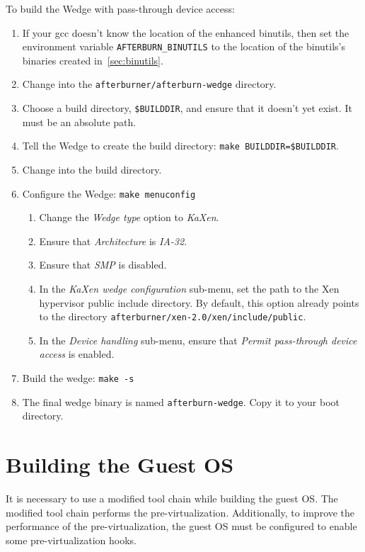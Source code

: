 \documentclass[twoside,a4paper]{report}
\newcommand{\code}[1]{{\tt #1}}
\newcommand{\cmd}[1]{\code{#1}}
\begin{document}
To build the Wedge with pass-through device access:
\begin{enumerate}
\item If your gcc doesn't know the location of the enhanced binutils,
then set the environment variable \code{AFTERBURN\_BINUTILS} to the
location of the binutils's binaries created in~\ref{sec:binutils}.
\item Change into the \code{afterburner/afterburn-wedge} directory.
\item Choose a build directory, \code{\$BUILDDIR}, and ensure that it
doesn't yet exist.  It must be an absolute path.
\item Tell the Wedge to create the build directory: 
\cmd{make BUILDDIR=\$BUILDDIR}.
\item Change into the build directory.
\item Configure the Wedge: \cmd{make menuconfig}
  \begin{enumerate}
  \item Change the \emph{Wedge type} option to \emph{KaXen}.
  \item Ensure that \emph{Architecture} is \emph{IA-32}.
  \item Ensure that \emph{SMP} is disabled.
  \item In the \emph{KaXen wedge configuration} sub-menu, set the path
  to the Xen hypervisor public include directory.  By default, this
  option already points to the directory
  \code{afterburner/xen-2.0/xen/include/public}.
  \item In the \emph{Device handling} sub-menu, ensure that
  \emph{Permit pass-through device access} is enabled.
  \end{enumerate}
\item Build the wedge: \cmd{make -s}
\item The final wedge binary is named \code{afterburn-wedge}.  Copy it
to your boot directory.
\end{enumerate}

%
%
\chapter{Building the Guest OS}

It is necessary to use a modified tool chain while building the guest
OS.  The modified tool chain performs the pre-virtualization.
Additionally, to improve the performance of the pre-virtualization,
the guest OS must be configured to enable some pre-virtualization
hooks.
\end{document}
